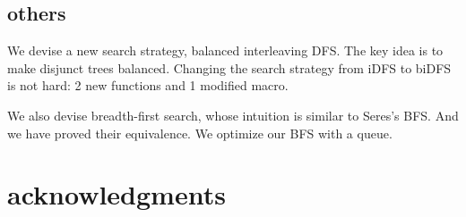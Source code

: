 \documentclass[format=acmlarge, review=true, authordraft=true]{acmart}
\begin{document}
\subsection{others}

We devise a new search strategy, balanced interleaving DFS. The key idea is to 
make disjunct trees balanced. Changing the search strategy from iDFS to biDFS is not hard: 2 new functions and 1 modified macro. 

We also devise breadth-first search, whose intuition is similar to Seres's BFS.
And we have proved their equivalence. We optimize our BFS with a queue.

\section*{acknowledgments}



\end{document}
